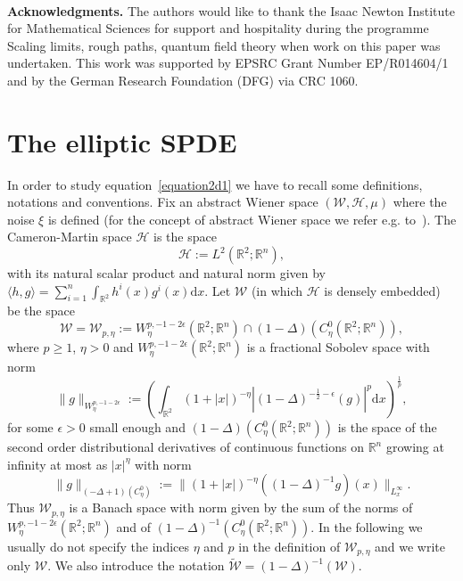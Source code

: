 \documentclass[a4paper,10pt]{article}
\newcommand{\assign}{:=}
\newcommand{\mathd}{\mathrm{d}}
\newcommand{\tmtextbf}[1]{{\bfseries{#1}}}
\begin{document}
\

{\noindent}\tmtextbf{Acknowledgments.} The authors would like to thank the
Isaac Newton Institute for Mathematical Sciences for support and hospitality
during the programme Scaling limits, rough paths, quantum field theory when
work on this paper was undertaken. This work was supported by EPSRC Grant
Number EP/R014604/1 and by the German Research Foundation (DFG) via CRC 1060.

\section{The elliptic SPDE}\label{sec:solutions}

In order to study equation~{\eqref{equation2d1}} we have to recall some
definitions, notations and conventions. Fix an abstract Wiener space
$(\mathcal{W}, \mathcal{H}, \mu)$ where the noise $\xi$ is defined (for the
concept of abstract Wiener space we refer e.g.
to~{\cite{Gross1967,Nualart2006,Ustunel2000}}). The Cameron-Martin space
$\mathcal{H}$ is the space
\[ \mathcal{H} \assign L^2 (\mathbb{R}^2 ; \mathbb{R}^n), \]
with its natural scalar product and natural norm given by $\langle h, g
\rangle = \sum_{i = 1}^n \int_{\mathbb{R}^2} h^i (x) g^i (x) \mathd x$. Let
$\mathcal{W}$ (in which $\mathcal{H}$ is densely embedded) be the space
\[ \mathcal{W}=\mathcal{W}_{p, \eta} \assign W^{p, - 1 - 2 \epsilon}_{\eta}
   (\mathbb{R}^2 ; \mathbb{R}^n) \cap (1 - \Delta) (C^0_{\eta} (\mathbb{R}^2 ;
   \mathbb{R}^n)), \]
where $p \geqslant 1$, $\eta > 0$ and $W_{\eta}^{p, - 1 - 2 \epsilon}
(\mathbb{R}^2 ; \mathbb{R}^n)$ is a fractional Sobolev space with norm
\[ \|g\|_{W_{\eta}^{p, - 1 - 2 \epsilon}} \assign \left( \int_{\mathbb{R}^2}
   (1 + | x |)^{- \eta} \left| (1 - \Delta)^{- \frac{1}{2} - \epsilon} (g)
   \right|^p \mathd x \right)^{\frac{1}{p}}, \]
for some $\epsilon > 0$ small enough and $(1 - \Delta) (C^0_{\eta}
(\mathbb{R}^2 ; \mathbb{R}^n))$ is the space of the second order
distributional derivatives of continuous functions on $\mathbb{R}^n$ growing
at infinity at most as $| x |^{\eta}$ with norm
\[ \|g\|_{(- \Delta + 1) (C^0_{\eta})} \assign \| (1 + | x |)^{- \eta} ((1 -
   \Delta)^{- 1} g) (x) \|_{L^{\infty}_x} . \]
Thus $\mathcal{W}_{p, \eta}$ is a Banach space with norm given by the sum of
the norms of $W_{\eta}^{p, - 1 - 2 \epsilon} (\mathbb{R}^2 ; \mathbb{R}^n)$
and of $(1 - \Delta)^{- 1} (C^0_{\eta} (\mathbb{R}^2 ; \mathbb{R}^n))$. In the
following we usually do not specify the indices $\eta$ and $p$ in the
definition of $\mathcal{W}_{p, \eta}$ and we write only $\mathcal{W}$. We also
introduce the notation $\tilde{\mathcal{W}} = (1 - \Delta)^{- 1} (\mathcal{W})
.$
\end{document}
